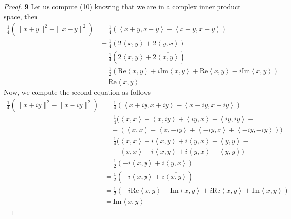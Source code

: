 \documentclass[11pt]{article}
\newcommand{\inprd}[1]{\left\langle{#1}\right\rangle}
\newcommand{\re}[1]{\text{Re}{#1}}
\newcommand{\im}[1]{\text{Im}{#1}}
\theoremstyle{definition}
\begin{document}
\cleardoublepage
\begin{proof}{\textbf{9}}
Let us compute (10) knowing that we are in a complex inner product space, then
\begin{align*}
    \frac{1}{4}(\|x + y\|^2 - \|x -y\|^2)
    &= \frac{1}{4}(\inprd{x + y, x + y} - \inprd{x - y, x - y})\\
    &= \frac{1}{4}(2\inprd{x,y} + 2\inprd{y,x})\\
    &= \frac{1}{4}(2\inprd{x,y} + 2\overline{\inprd{x,y}})\\
    &= \frac{1}{2}(\re{\inprd{x,y}} + i\im{\inprd{x,y}}
    + \re{\inprd{x,y}} - i\im{\inprd{x,y}})\\
    &= \re{\inprd{x,y}}
\end{align*}
Now, we compute the second equation as follows
\begin{align*}
    \frac{1}{4}(\|x + iy\|^2 - \|x -iy\|^2)
    &= \frac{1}{4}(\inprd{x + iy, x + iy} - \inprd{x - iy, x - iy})\\
    &= \frac{1}{4}(\inprd{x,x} + \inprd{x,iy} + \inprd{iy,x} + \inprd{iy,iy} -\\
    &\quad- (\inprd{x,x} + \inprd{x,-iy} + \inprd{-iy,x} + \inprd{-iy,-iy}))\\
    &= \frac{1}{4}(\inprd{x,x} - i\inprd{x,y} + i\inprd{y,x} + \inprd{y,y} -\\
    &\quad- \inprd{x,x} - i\inprd{x,y} + i\inprd{y,x} - \inprd{y,y})\\
    &= \frac{1}{2}(-i\inprd{x,y} + i\inprd{y,x})\\
    &= \frac{1}{2}(-i\inprd{x,y} + i\overline{\inprd{x,y}})\\
    &= \frac{1}{2}(-i\re{\inprd{x,y}} + \im{\inprd{x,y}} + i\re{\inprd{x,y}}
    + \im{\inprd{x,y}})\\
    &= \im{\inprd{x,y}}
\end{align*}
\end{proof}
\end{document}
